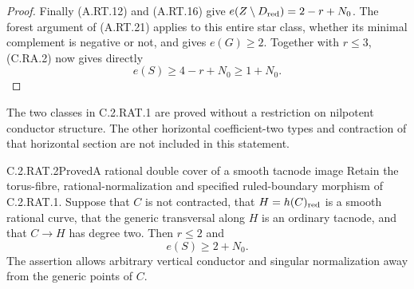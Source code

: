 \begin{proof}
Finally (A.RT.12) and (A.RT.16) give
$e(Z\setminus D_{\rm red})=2-r+N_0$.
The forest argument of (A.RT.21) applies to this entire
star class, whether its minimal complement is negative
or not, and gives $e(G)\ge2$.
Together with $r\le3$, (C.RA.2) now gives directly
\[
                 e(S)\ge4-r+N_0\ge1+N_0.
 \tag{C.RA.17}
\]
\end{proof}

The two classes in C.2.RAT.1 are proved without a restriction
on nilpotent conductor structure. The other horizontal
coefficient-two types and contraction of that horizontal
section are not included in this statement.

\begin{statement}{C.2.RAT.2}{Proved}{A rational double cover of a smooth tacnode image}
Retain the torus-fibre, rational-normalization and specified
ruled-boundary morphism of C.2.RAT.1. Suppose that $C$ is not
contracted, that $H=h(C)_{\rm red}$ is a smooth rational curve,
that the generic transversal along $H$ is an ordinary tacnode,
and that $C\to H$ has degree two. Then $r\le2$ and
\[
                         e(S)\ge2+N_0.
\tag{C.RA.18}
\]
The assertion allows arbitrary vertical conductor and singular
normalization away from the generic points of $C$.
\end{statement}
